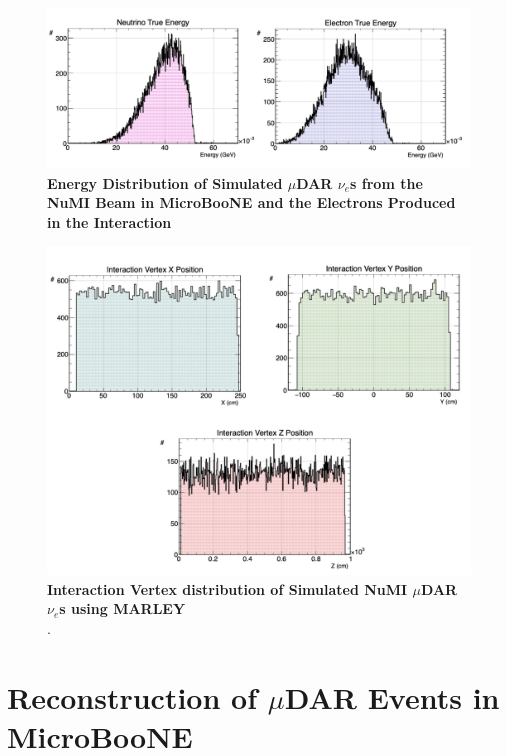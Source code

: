 \begin{figure}[h!]
    \centering
    \includegraphics[width=160mm]{Figures/NuMI_muDAR_Neutrino_Electron_Energy.jpeg}
    \caption[Energy Distribution of Simulated $\mu$DAR $\nu_e$s from the NuMI Beam in MicroBooNE and the Electrons Produced in the Interaction]{{\textbf{Energy Distribution of Simulated $\mu$DAR $\nu_e$s from the NuMI Beam in MicroBooNE and the Electrons Produced in the Interaction}}\\}
    \label{sim_energy_dist_figures}
\end{figure}

\begin{figure}[h!]
    \centering
    \includegraphics[width=160mm]{Figures/NuMI_muDAR_vertex.jpeg}
    \caption[Interaction Vertex Distribution of Simulated NuMI $\mu$DAR $\nu_e$s using MARLEY]{{\textbf{Interaction Vertex distribution of Simulated NuMI $\mu$DAR $\nu_e$s using MARLEY}}\\ .}
    \label{sim_vertex_dist_figures}
\end{figure}

\newpage
\section{Reconstruction of $\mu$DAR Events in MicroBooNE}


